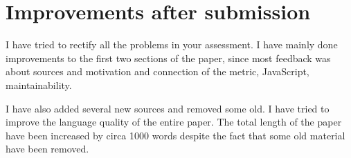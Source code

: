 \documentclass[conference, a4paper]{IEEEtran}
\begin{document}
\section*{Improvements after submission}
I have tried to rectify all the problems in your assessment. I have mainly done improvements to the first two sections of the paper, since most feedback was about sources and motivation and connection of the metric, JavaScript, maintainability.

I have also added several new sources and removed some old. I have tried to improve the language quality of the entire paper. The total length of the paper have been increased by circa 1000 words despite the fact that some old material have been removed.
\end{document}

